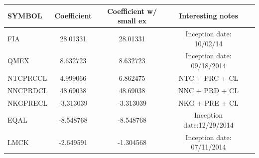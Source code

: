 \documentclass{article}
\begin{document}
\begin{center}
\begin{tabular}{ | l | c | c | c | c |}
\hline
SYMBOL & Coefficient & Coefficient w/ small ex & Interesting notes \\ \hline 
FIA  & 28.01331  & 28.01331  & Inception date: 10/02/14\\ \hline
QMEX & 8.632723 & 8.632723 & Inception date: 09/18/2014\\ \hline
NTCPRCCL & 4.999066  &  6.862475 & NTC + PRC + CL \\ \hline
NNCPRDCL & 48.69038 & 48.69038 & NNC + PRD + CL \\ \hline
NKGPRECL & -3.313039 & -3.313039 & NKG + PRE + CL \\ \hline  
EQAL & -8.548768 & -8.548768 & Inception date:12/29/2014 \\ \hline  
LMCK & -2.649591 & -1.304568 & Inception date: 07/11/2014\\ \hline
\end{tabular}\\
\end{center}
\end{document}
